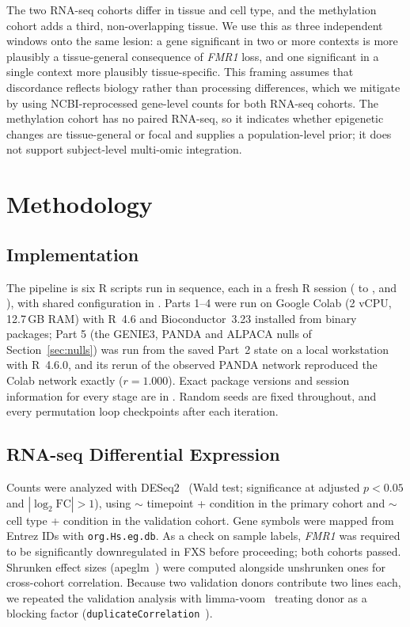 \documentclass[journal]{IEEEtran}
\newcommand{\gene}[1]{\textit{#1}}
\begin{document}
The two RNA-seq cohorts differ in tissue and cell type, and the methylation cohort adds a third, non-overlapping tissue. We use this as three independent windows onto the same lesion: a gene significant in two or more contexts is more plausibly a tissue-general consequence of \gene{FMR1} loss, and one significant in a single context more plausibly tissue-specific. This framing assumes that discordance reflects biology rather than processing differences, which we mitigate by using NCBI-reprocessed gene-level counts for both RNA-seq cohorts. The methylation cohort has no paired RNA-seq, so it indicates whether epigenetic changes are tissue-general or focal and supplies a population-level prior; it does not support subject-level multi-omic integration.

\section{Methodology}
\subsection{Implementation}
The pipeline is six R scripts run in sequence, each in a fresh R session ( to ,  and ), with shared configuration in . Parts 1--4 were run on Google Colab (2 vCPU, 12.7\,GB RAM) with R~4.6 and Bioconductor~3.23 installed from binary packages; Part 5 (the GENIE3, PANDA and ALPACA nulls of Section~\ref{sec:nulls}) was run from the saved Part~2 state on a local workstation with R~4.6.0, and its rerun of the observed PANDA network reproduced the Colab network exactly ($r=1.000$). Exact package versions and session information for every stage are in . Random seeds are fixed throughout, and every permutation loop checkpoints after each iteration.

\subsection{RNA-seq Differential Expression}\label{sec:de}
Counts were analyzed with DESeq2~\cite{deseq2} (Wald test; significance at adjusted $p<0.05$ and $|\log_2\mathrm{FC}|>1$), using $\sim$ timepoint + condition in the primary cohort and $\sim$ cell type + condition in the validation cohort. Gene symbols were mapped from Entrez IDs with \texttt{org.Hs.eg.db}. As a check on sample labels, \gene{FMR1} was required to be significantly downregulated in FXS before proceeding; both cohorts passed. Shrunken effect sizes (apeglm~\cite{apeglm}) were computed alongside unshrunken ones for cross-cohort correlation. Because two validation donors contribute two lines each, we repeated the validation analysis with limma-voom~\cite{voom} treating donor as a blocking factor (\texttt{duplicateCorrelation}~\cite{dupcor}).
\end{document}
